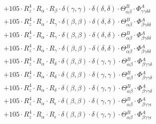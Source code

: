 \documentclass{article}
\begin{document}
\begin{subequations}
\begin{gather}
\begin{array}{c}
 \\[0.2em] 		 + 105 \cdot R_{z}^{4} \cdot R_{\alpha{}} \cdot R_{\beta{}} \cdot \delta{}\left(\gamma{}, \gamma{}\right) \cdot \delta{}\left(\delta{}, \delta{}\right) \cdot \Theta{}^{B}_{\alpha{}\beta{}} \cdot \Phi{}^{A}_{\gamma{}\gamma{}\delta{}\delta{}} 
 \\[0.2em] 		 + 105 \cdot R_{z}^{4} \cdot R_{\alpha{}} \cdot R_{\gamma{}} \cdot \delta{}\left(\beta{}, \beta{}\right) \cdot \delta{}\left(\delta{}, \delta{}\right) \cdot \Theta{}^{B}_{\alpha{}\beta{}} \cdot \Phi{}^{A}_{\beta{}\gamma{}\delta{}\delta{}} 
 \\[0.2em] 		 + 105 \cdot R_{z}^{4} \cdot R_{\alpha{}} \cdot R_{\gamma{}} \cdot \delta{}\left(\beta{}, \beta{}\right) \cdot \delta{}\left(\delta{}, \delta{}\right) \cdot \Theta{}^{B}_{\alpha{}\beta{}} \cdot \Phi{}^{A}_{\beta{}\gamma{}\delta{}\delta{}} 
 \\[0.2em] 		 + 105 \cdot R_{z}^{4} \cdot R_{\alpha{}} \cdot R_{\gamma{}} \cdot \delta{}\left(\beta{}, \beta{}\right) \cdot \delta{}\left(\delta{}, \delta{}\right) \cdot \Theta{}^{B}_{\alpha{}\beta{}} \cdot \Phi{}^{A}_{\beta{}\gamma{}\delta{}\delta{}} 
 \\[0.2em] 		 + 105 \cdot R_{z}^{4} \cdot R_{\alpha{}} \cdot R_{\delta{}} \cdot \delta{}\left(\beta{}, \beta{}\right) \cdot \delta{}\left(\gamma{}, \gamma{}\right) \cdot \Theta{}^{B}_{\alpha{}\beta{}} \cdot \Phi{}^{A}_{\beta{}\gamma{}\gamma{}\delta{}} 
 \\[0.2em] 		 + 105 \cdot R_{z}^{4} \cdot R_{\alpha{}} \cdot R_{\delta{}} \cdot \delta{}\left(\beta{}, \beta{}\right) \cdot \delta{}\left(\gamma{}, \gamma{}\right) \cdot \Theta{}^{B}_{\alpha{}\beta{}} \cdot \Phi{}^{A}_{\beta{}\gamma{}\gamma{}\delta{}} 
 \\[0.2em] 		 + 105 \cdot R_{z}^{4} \cdot R_{\alpha{}} \cdot R_{\delta{}} \cdot \delta{}\left(\beta{}, \beta{}\right) \cdot \delta{}\left(\gamma{}, \gamma{}\right) \cdot \Theta{}^{B}_{\alpha{}\beta{}} \cdot \Phi{}^{A}_{\beta{}\gamma{}\gamma{}\delta{}} 
 \\[0.2em] 		 + 105 \cdot R_{z}^{4} \cdot R_{\alpha{}} \cdot R_{\epsilon{}} \cdot \delta{}\left(\beta{}, \beta{}\right) \cdot \delta{}\left(\gamma{}, \gamma{}\right) \cdot \Theta{}^{B}_{\alpha{}\beta{}} \cdot \Phi{}^{A}_{\beta{}\gamma{}\gamma{}\epsilon{}} 
 \\[0.2em] 		 + 105 \cdot R_{z}^{4} \cdot R_{\alpha{}} \cdot R_{\epsilon{}} \cdot \delta{}\left(\beta{}, \beta{}\right) \cdot \delta{}\left(\gamma{}, \gamma{}\right) \cdot \Theta{}^{B}_{\alpha{}\beta{}} \cdot \Phi{}^{A}_{\beta{}\gamma{}\gamma{}\epsilon{}} 

\end{array}
\end{gather}
\end{subequations}
\end{document}
